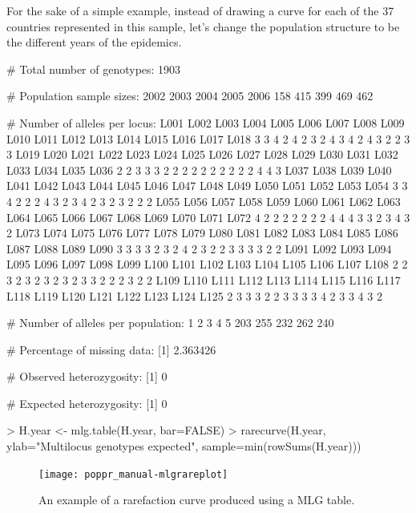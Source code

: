 \documentclass[letterpaper]{article}
\begin{document}
For the sake of a simple example, instead of drawing a curve for each of the 37 countries represented in this sample, let's change the population structure to be the different years of the epidemics. 
\begin{Schunk}
\begin{Soutput}
 # Total number of genotypes:  1903 

 # Population sample sizes:  
2002 2003 2004 2005 2006 
 158  415  399  469  462 

 # Number of alleles per locus:  
L001 L002 L003 L004 L005 L006 L007 L008 L009 L010 L011 L012 L013 L014 L015 L016 L017 L018 
   3    3    4    2    4    2    3    2    4    3    4    2    4    3    2    2    3    3 
L019 L020 L021 L022 L023 L024 L025 L026 L027 L028 L029 L030 L031 L032 L033 L034 L035 L036 
   2    2    3    3    3    2    2    2    2    2    2    2    2    2    2    4    4    3 
L037 L038 L039 L040 L041 L042 L043 L044 L045 L046 L047 L048 L049 L050 L051 L052 L053 L054 
   3    3    4    2    2    2    4    3    2    3    4    2    3    2    3    2    2    2 
L055 L056 L057 L058 L059 L060 L061 L062 L063 L064 L065 L066 L067 L068 L069 L070 L071 L072 
   4    2    2    2    2    2    2    2    4    4    4    3    3    2    3    4    3    2 
L073 L074 L075 L076 L077 L078 L079 L080 L081 L082 L083 L084 L085 L086 L087 L088 L089 L090 
   3    3    3    3    2    3    2    4    2    3    2    2    3    3    3    3    2    2 
L091 L092 L093 L094 L095 L096 L097 L098 L099 L100 L101 L102 L103 L104 L105 L106 L107 L108 
   2    2    3    2    3    2    3    2    3    2    3    3    2    2    2    3    2    2 
L109 L110 L111 L112 L113 L114 L115 L116 L117 L118 L119 L120 L121 L122 L123 L124 L125 
   2    3    3    3    2    2    3    3    3    3    4    2    3    3    4    3    2 

 # Number of alleles per population:  
  1   2   3   4   5 
203 255 232 262 240 

 # Percentage of missing data:  
[1] 2.363426

 # Observed heterozygosity:  
[1] 0

 # Expected heterozygosity:  
[1] 0
\end{Soutput}
\end{Schunk}
\begin{Schunk}
\begin{Sinput}
> H.year <- mlg.table(H.year, bar=FALSE)
> rarecurve(H.year, ylab="Multilocus genotypes expected", sample=min(rowSums(H.year)))
\end{Sinput}
\end{Schunk}
\begin{figure}[h!]
  \centering
  \caption{An example of a rarefaction curve produced using a MLG table.}
  \label{rarecurve}
\texttt{[image: poppr\_manual-mlgrareplot]}
\end{figure}
\end{document}
